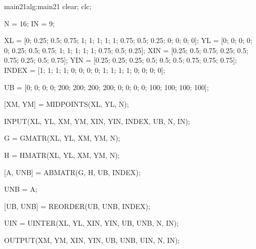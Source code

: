 \begin{matlab}{main21}{alg:main21}
clear; clc; 

N = 16;
IN = 9;

XL = [0; 0.25; 0.5; 0.75; 1; 1; 1; 1; 1; 0.75; 0.5; 0.25; 0; 0; 0; 0];
YL = [0; 0; 0; 0; 0; 0.25; 0.5; 0.75; 1; 1; 1; 1; 1; 0.75; 0.5; 0.25];
XIN = [0.25; 0.5; 0.75; 0.25; 0.5; 0.75; 0.25; 0.5; 0.75];
YIN = [0.25; 0.25; 0.25; 0.5; 0.5; 0.5; 0.75; 0.75; 0.75];
INDEX = [1; 1; 1; 1; 0; 0; 0; 0; 1; 1; 1; 1; 0; 0; 0; 0];


UB = [0; 0; 0; 0; 200; 200; 200; 200; 0; 0; 0; 0; 100; 100; 100; 100];

[XM, YM] = MIDPOINTS(XL, YL, N);

INPUT(XL, YL, XM, YM, XIN, YIN, INDEX, UB, N, IN);

G = GMATR(XL, YL, XM, YM, N);

H = HMATR(XL, YL, XM, YM, N);

[A, UNB] = ABMATR(G, H, UB, INDEX);

UNB = A\UNB;

[UB, UNB] = REORDER(UB, UNB, INDEX);

UIN = UINTER(XL, YL, XIN, YIN, UB, UNB, N, IN);

OUTPUT(XM, YM, XIN, YIN, UB, UNB, UIN, N, IN);

\end{matlab}

\newpage

